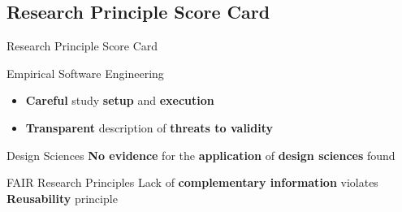 \documentclass{beamer}
\begin{document}
\subsection*{Research Principle Score Card}
\begin{frame}{Research Principle Score Card}
	\begin{exampleblock}{ Empirical Software Engineering}
		\begin{itemize}
			\item \textbf{Careful} study \textbf{setup} and \textbf{execution}
			\item \textbf{Transparent} description of \textbf{threats to validity}
		\end{itemize}
	\end{exampleblock}

	\begin{alertblock}{ Design Sciences}
		\textbf{No evidence} for the \textbf{application} of \textbf{design sciences} found
	\end{alertblock}

	\begin{alertblock}{ FAIR Research Principles}
		Lack of \textbf{complementary information} violates \textbf{Reusability} principle
	\end{alertblock}
\end{frame}

\end{document}
